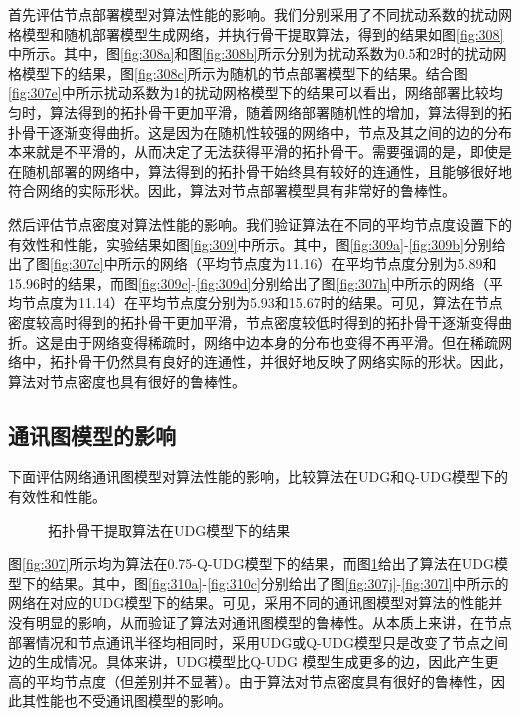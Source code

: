 首先评估节点部署模型对算法性能的影响。我们分别采用了不同扰动系数的扰动网格模型和随机部署模型生成网络，并执行骨干提取算法，得到的结果如图\ref{fig:308}中所示。其中，图\ref{fig:308a}和图\ref{fig:308b}所示分别为扰动系数为0.5和2时的扰动网格模型下的结果，图\ref{fig:308c}所示为随机的节点部署模型下的结果。结合图\ref{fig:307e}中所示扰动系数为1的扰动网格模型下的结果可以看出，网络部署比较均匀时，算法得到的拓扑骨干更加平滑，随着网络部署随机性的增加，算法得到的拓扑骨干逐渐变得曲折。这是因为在随机性较强的网络中，节点及其之间的边的分布本来就是不平滑的，从而决定了无法获得平滑的拓扑骨干。需要强调的是，即使是在随机部署的网络中，算法得到的拓扑骨干始终具有较好的连通性，且能够很好地符合网络的实际形状。因此，算法对节点部署模型具有非常好的鲁棒性。

然后评估节点密度对算法性能的影响。我们验证算法在不同的平均节点度设置下的有效性和性能，实验结果如图\ref{fig:309}中所示。其中，图\ref{fig:309a}-\ref{fig:309b}分别给出了图\ref{fig:307c}中所示的网络（平均节点度为11.16）在平均节点度分别为5.89和15.96时的结果，而图\ref{fig:309c}-\ref{fig:309d}分别给出了图\ref{fig:307h}中所示的网络（平均节点度为11.14）在平均节点度分别为5.93和15.67时的结果。可见，算法在节点密度较高时得到的拓扑骨干更加平滑，节点密度较低时得到的拓扑骨干逐渐变得曲折。这是由于网络变得稀疏时，网络中边本身的分布也变得不再平滑。但在稀疏网络中，拓扑骨干仍然具有良好的连通性，并很好地反映了网络实际的形状。因此，算法对节点密度也具有很好的鲁棒性。
\subsection{通讯图模型的影响}
下面评估网络通讯图模型对算法性能的影响，比较算法在UDG和Q-UDG模型下的有效性和性能。
\begin{figure}[h]
  \centering
  \hspace{0.25em}%
  \hspace{0.25em}%
\caption{拓扑骨干提取算法在UDG模型下的结果}
\label{fig:310}
\end{figure}

图\ref{fig:307}所示均为算法在0.75-Q-UDG模型下的结果，而图\ref{fig:310}给出了算法在UDG模型下的结果。其中，图\ref{fig:310a}-\ref{fig:310c}分别给出了图\ref{fig:307j}-\ref{fig:307l}中所示的网络在对应的UDG模型下的结果。可见，采用不同的通讯图模型对算法的性能并没有明显的影响，从而验证了算法对通讯图模型的鲁棒性。从本质上来讲，在节点部署情况和节点通讯半径均相同时，采用UDG或Q-UDG模型只是改变了节点之间边的生成情况。具体来讲，UDG模型比Q-UDG 模型生成更多的边，因此产生更高的平均节点度（但差别并不显著）。由于算法对节点密度具有很好的鲁棒性，因此其性能也不受通讯图模型的影响。
